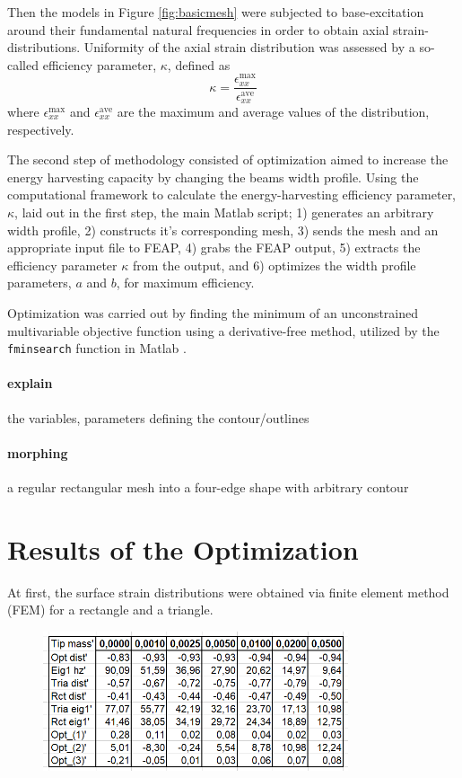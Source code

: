 \documentclass{article}
\begin{document}
Then the models in Figure \ref{fig:basicmesh} were subjected to base-excitation around their fundamental natural frequencies in order to obtain axial strain-distributions. Uniformity of the axial strain distribution was assessed by a so-called efficiency parameter, $\kappa$, defined as
\begin{equation}
    \kappa = \frac{\epsilon^{\mathrm{max}}_{xx}}{\epsilon^{\mathrm{ave}}_{xx}}
\end{equation}
where $\epsilon^{\mathrm{max}}_{xx}$ and $\epsilon^{\mathrm{ave}}_{xx}$ are the maximum and average values of the distribution, respectively.


The second step of methodology consisted of optimization aimed to increase the energy harvesting capacity by changing the beams width profile. Using the  computational framework to calculate the energy-harvesting efficiency parameter, $\kappa$, laid out in the first step, the main Matlab script; 1) generates an arbitrary width profile, 2) constructs it's corresponding mesh, 3) sends the mesh and an appropriate input file to FEAP, 4) grabs the FEAP output, 5) extracts the efficiency parameter $\kappa$ from the output, and 6) optimizes the width profile parameters, $a$ and $b$, for maximum efficiency. 

Optimization was carried out by finding the minimum of an unconstrained multivariable objective function using a derivative-free method, utilized by the \texttt{fminsearch} function in Matlab \cite{matlab}. 

\paragraph{explain} the variables, parameters defining the contour/outlines

\paragraph{morphing} a regular rectangular mesh into a four-edge shape with arbitrary contour

\section{Results of the Optimization}
\label{sec:fem_results}
At first, the surface strain distributions were obtained via finite element method (FEM) for a rectangle and a triangle. 

\begin{figure}[ht!]
\centering
\includegraphics[width=90mm]{figures/tablo_prim.PNG}
\caption{ \label{overflow}}
\end{figure}
\end{document}
